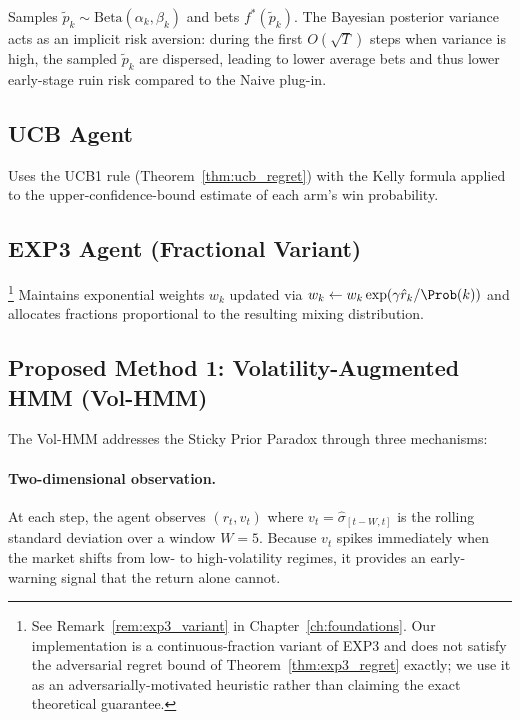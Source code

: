 Samples $\tilde p_k \sim \text{Beta}(\alpha_k, \beta_k)$ and bets
$f^*(\tilde p_k)$.  The Bayesian posterior variance acts as an implicit
risk aversion: during the first $O(\sqrt{T})$ steps when variance is high,
the sampled $\tilde p_k$ are dispersed, leading to lower average bets and
thus lower early-stage ruin risk compared to the Naive plug-in.

\subsection{UCB Agent}

Uses the UCB1 rule (Theorem~\ref{thm:ucb_regret}) with the Kelly formula
applied to the upper-confidence-bound estimate of each arm's win probability.

\subsection{EXP3 Agent (Fractional Variant)}

\footnote{See Remark~\ref{rem:exp3_variant} in Chapter~\ref{ch:foundations}.
Our implementation is a continuous-fraction variant of EXP3 and does not
satisfy the adversarial regret bound of Theorem~\ref{thm:exp3_regret}
exactly; we use it as an adversarially-motivated heuristic rather than
claiming the exact theoretical guarantee.}
Maintains exponential weights $w_k$ updated via
$w_k \leftarrow w_k \exp(\gamma \hat r_k / \Prob(k))$
and allocates fractions proportional to the resulting mixing distribution.

\subsection{Proposed Method 1: Volatility-Augmented HMM (Vol-HMM)}

The Vol-HMM addresses the Sticky Prior Paradox through three mechanisms:

\paragraph{Two-dimensional observation.}
At each step, the agent observes $(r_t, v_t)$ where
$v_t = \hat\sigma_{[t-W, t]}$ is the rolling standard deviation over a window
$W = 5$.  Because $v_t$ spikes immediately when the market shifts from low-
to high-volatility regimes, it provides an early-warning signal that the
return alone cannot.

